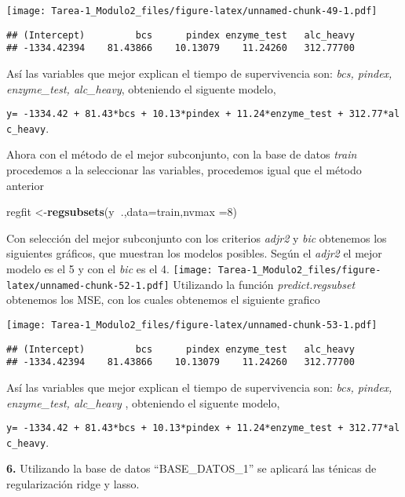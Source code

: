 \documentclass[
]{article}
\newenvironment{Shaded}{\begin{snugshade}}{\end{snugshade}}
\newcommand{\DataTypeTok}[1]{\textcolor[rgb]{0.13,0.29,0.53}{#1}}
\newcommand{\DecValTok}[1]{\textcolor[rgb]{0.00,0.00,0.81}{#1}}
\newcommand{\KeywordTok}[1]{\textcolor[rgb]{0.13,0.29,0.53}{\textbf{#1}}}
\newcommand{\NormalTok}[1]{#1}
\newcommand{\OperatorTok}[1]{\textcolor[rgb]{0.81,0.36,0.00}{\textbf{#1}}}
\begin{document}
\texttt{[image: Tarea-1\_Modulo2\_files/figure-latex/unnamed-chunk-49-1.pdf]}

\begin{verbatim}
## (Intercept)         bcs      pindex enzyme_test   alc_heavy 
## -1334.42394    81.43866    10.13079    11.24260   312.77700
\end{verbatim}

Así las variables que mejor explican el tiempo de supervivencia son:
\emph{bcs, pindex, enzyme\_test, alc\_heavy}, obteniendo el siguente
modelo,

\texttt{y=\ -1334.42\ +\ 81.43*bcs\ +\ 10.13*pindex\ +\ 11.24*enzyme\_test\ +\ 312.77*alc\_heavy}.

Ahora con el método de el mejor subconjunto, con la base de datos
\emph{train} procedemos a la seleccionar las variables, procedemos igual
que el método anterior

\begin{Shaded}
\begin{Highlighting}[]
\NormalTok{regfit <-}\KeywordTok{regsubsets}\NormalTok{(y}\OperatorTok{~}\NormalTok{.,}\DataTypeTok{data=}\NormalTok{train,}\DataTypeTok{nvmax =}\DecValTok{8}\NormalTok{)}
\end{Highlighting}
\end{Shaded}

Con selección del mejor subconjunto con los criterios \emph{adjr2} y
\emph{bic} obtenemos los siguientes gráficos, que muestran los modelos
posibles. Según el \emph{adjr2} el mejor modelo es el 5 y con el
\emph{bic} es el 4.
\texttt{[image: Tarea-1\_Modulo2\_files/figure-latex/unnamed-chunk-52-1.pdf]}
Utilizando la función \emph{predict.regsubset} obtenemos los MSE, con
los cuales obtenemos el siguiente grafico

\texttt{[image: Tarea-1\_Modulo2\_files/figure-latex/unnamed-chunk-53-1.pdf]}

\begin{verbatim}
## (Intercept)         bcs      pindex enzyme_test   alc_heavy 
## -1334.42394    81.43866    10.13079    11.24260   312.77700
\end{verbatim}

Así las variables que mejor explican el tiempo de supervivencia son:
\emph{bcs, pindex, enzyme\_test, alc\_heavy }, obteniendo el siguente
modelo,

\texttt{y=\ -1334.42\ +\ 81.43*bcs\ +\ 10.13*pindex\ +\ 11.24*enzyme\_test\ +\ 312.77*alc\_heavy}.

\textbf{6.} Utilizando la base de datos ``BASE\_DATOS\_1'' se aplicará
las ténicas de regularización ridge y lasso.
\end{document}
